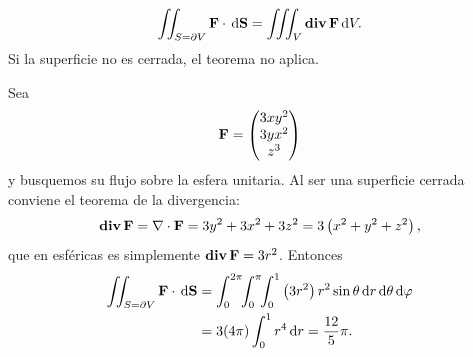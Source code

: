 \begin{teorema}[Divergencia]
  \label{teo:divergencia}
  \begin{equation}
    \label{eq:divergencia}
    \iint_{S=\partial V}\mathbf{F}\cdot\,\mathrm{d}\mathbf{S}
      =\iiint_{V}\operatorname{\mathbf{div}}\mathbf{F}\,\mathrm{d} V .
  \end{equation}
  Si la superficie no es cerrada, el teorema no aplica.
\end{teorema}

\begin{ejemplo}
  \label{ej:divergencia}
  Sea
  \begin{equation}
    \label{eq:F_divergencia}
    \mathbf{F}=
    \begin{pmatrix}
      3xy^2\\3yx^2\\z^3
    \end{pmatrix}
  \end{equation}
  y busquemos su flujo sobre la esfera unitaria. Al ser una superficie cerrada
  conviene el teorema de la divergencia:
  \begin{equation}
    \label{eq:div_F}
    \operatorname{\mathbf{div}}\mathbf{F}=\nabla\cdot\mathbf{F}=3y^2+3x^2+3z^2=3\left( x^2+y^2+z^2 \right),
  \end{equation}
  que en esf\'ericas es simplemente $\operatorname{\mathbf{div}}\mathbf{F}=3r^2$. Entonces
  \begin{equation}
    \label{eq:flujo_esfera}
    \begin{aligned}
      \iint_{S=\partial V}\mathbf{F}\cdot\,\mathrm{d}\mathbf{S}
        &=\int_{0}^{2\pi}\!\!\int_{0}^{\pi}\!\!\int_{0}^{1}
          \left( 3r^2 \right)r^2\sin\theta\,\mathrm{d} r\,\mathrm{d}\theta\,\mathrm{d}\varphi\\
        &=3(4\pi)\int_{0}^{1}r^4\,\mathrm{d} r=\frac{12}{5}\pi .
    \end{aligned}
  \end{equation}
\end{ejemplo}
